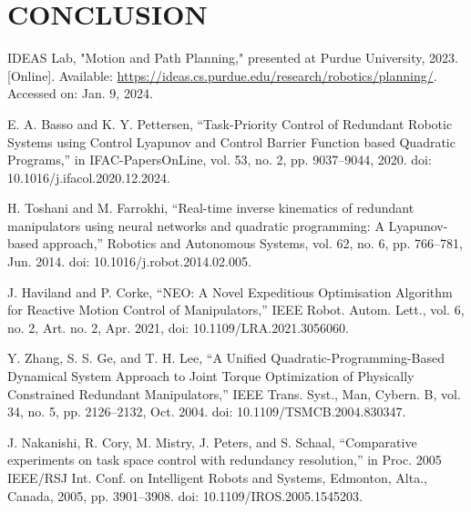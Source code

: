 \documentclass[letterpaper, 10 pt, conference]{ieeeconf}  %
\begin{document}
\section{CONCLUSION}

\addtolength{\textheight}{-12cm}   %


\begin{thebibliography}{99}
	
IDEAS Lab, "Motion and Path Planning," presented at Purdue University, 2023. [Online]. Available: \url{https://ideas.cs.purdue.edu/research/robotics/planning/}. Accessed on: Jan. 9, 2024.
	
 E. A. Basso and K. Y. Pettersen, “Task-Priority Control of Redundant Robotic Systems using Control Lyapunov and Control Barrier Function based Quadratic Programs,” in IFAC-PapersOnLine, vol. 53, no. 2, pp. 9037–9044, 2020. doi: 10.1016/j.ifacol.2020.12.2024.


 H. Toshani and M. Farrokhi, “Real-time inverse kinematics of redundant manipulators using neural networks and quadratic programming: A Lyapunov-based approach,” Robotics and Autonomous Systems, vol. 62, no. 6, pp. 766–781, Jun. 2014. doi: 10.1016/j.robot.2014.02.005.

 J. Haviland and P. Corke, “NEO: A Novel Expeditious Optimisation Algorithm for Reactive Motion Control of Manipulators,” IEEE Robot. Autom. Lett., vol. 6, no. 2, Art. no. 2, Apr. 2021, doi: 10.1109/LRA.2021.3056060.


 Y. Zhang, S. S. Ge, and T. H. Lee, “A Unified Quadratic-Programming-Based Dynamical System Approach to Joint Torque Optimization of Physically Constrained Redundant Manipulators,” IEEE Trans. Syst., Man, Cybern. B, vol. 34, no. 5, pp. 2126–2132, Oct. 2004. doi: 10.1109/TSMCB.2004.830347.

 J. Nakanishi, R. Cory, M. Mistry, J. Peters, and S. Schaal, “Comparative experiments on task space control with redundancy resolution,” in Proc. 2005 IEEE/RSJ Int. Conf. on Intelligent Robots and Systems, Edmonton, Alta., Canada, 2005, pp. 3901–3908. doi: 10.1109/IROS.2005.1545203.


\end{thebibliography}
\end{document}
